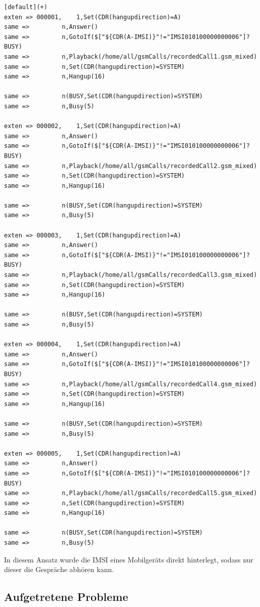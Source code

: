 \begin{lstlisting}
[default](+)
exten => 000001,	1,Set(CDR(hangupdirection)=A)
same =>			n,Answer()
same =>			n,GotoIf($["${CDR(A-IMSI)}"!="IMSI010100000000006"]?BUSY)
same =>			n,Playback(/home/all/gsmCalls/recordedCall1.gsm_mixed)
same =>			n,Set(CDR(hangupdirection)=SYSTEM)
same =>			n,Hangup(16)

same =>			n(BUSY,Set(CDR(hangupdirection)=SYSTEM)
same =>			n,Busy(5)

exten => 000002,	1,Set(CDR(hangupdirection)=A)
same =>			n,Answer()
same =>			n,GotoIf($["${CDR(A-IMSI)}"!="IMSI010100000000006"]?BUSY)
same =>			n,Playback(/home/all/gsmCalls/recordedCall2.gsm_mixed)
same =>			n,Set(CDR(hangupdirection)=SYSTEM)
same =>			n,Hangup(16)

same =>			n(BUSY,Set(CDR(hangupdirection)=SYSTEM)
same =>			n,Busy(5)

exten => 000003,	1,Set(CDR(hangupdirection)=A)
same =>			n,Answer()
same =>			n,GotoIf($["${CDR(A-IMSI)}"!="IMSI010100000000006"]?BUSY)
same =>			n,Playback(/home/all/gsmCalls/recordedCall3.gsm_mixed)
same =>			n,Set(CDR(hangupdirection)=SYSTEM)
same =>			n,Hangup(16)

same =>			n(BUSY,Set(CDR(hangupdirection)=SYSTEM)
same =>			n,Busy(5)

exten => 000004,	1,Set(CDR(hangupdirection)=A)
same =>			n,Answer()
same =>			n,GotoIf($["${CDR(A-IMSI)}"!="IMSI010100000000006"]?BUSY)
same =>			n,Playback(/home/all/gsmCalls/recordedCall4.gsm_mixed)
same =>			n,Set(CDR(hangupdirection)=SYSTEM)
same =>			n,Hangup(16)

same =>			n(BUSY,Set(CDR(hangupdirection)=SYSTEM)
same =>			n,Busy(5)

exten => 000005,	1,Set(CDR(hangupdirection)=A)
same =>			n,Answer()
same =>			n,GotoIf($["${CDR(A-IMSI)}"!="IMSI010100000000006"]?BUSY)
same =>			n,Playback(/home/all/gsmCalls/recordedCall5.gsm_mixed)
same =>			n,Set(CDR(hangupdirection)=SYSTEM)
same =>			n,Hangup(16)

same =>			n(BUSY,Set(CDR(hangupdirection)=SYSTEM)
same =>			n,Busy(5)
\end{lstlisting}

In diesem Ansatz wurde die IMSI eines Mobilgeräts direkt hinterlegt, sodass nur dieser die Gespräche abhören kann. 






\subsection{Aufgetretene Probleme}


